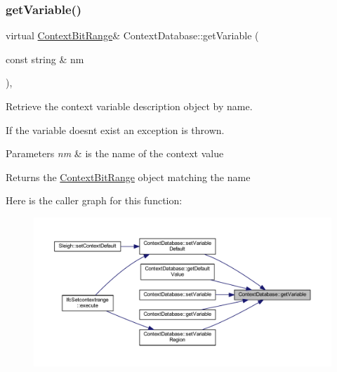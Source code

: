 \subsubsection{\texorpdfstring{getVariable()}{getVariable()}\hspace{0.1cm}{\footnotesize\ttfamily [1/3]}}
{\footnotesize\ttfamily virtual \mbox{\hyperlink{class_context_bit_range}{Context\+Bit\+Range}}\& Context\+Database\+::get\+Variable (\begin{DoxyParamCaption}\item[{const string \&}]{nm }\end{DoxyParamCaption})\hspace{0.3cm}{\ttfamily [protected]}, {}}



Retrieve the context variable description object by name. 

If the variable doesn\textquotesingle{}t exist an exception is thrown. 
\begin{DoxyParams}{Parameters}
{\em nm} & is the name of the context value \\
\hline
\end{DoxyParams}
\begin{DoxyReturn}{Returns}
the \mbox{\hyperlink{class_context_bit_range}{Context\+Bit\+Range}} object matching the name 
\end{DoxyReturn}
Here is the caller graph for this function\+:
\nopagebreak
\begin{figure}[H]
\begin{center}
\leavevmode
\includegraphics[width=350pt]{class_context_database_a1ebd1d177e17c5ea1e877f8b1d8c581d_icgraph}
\end{center}
\end{figure}
\mbox{\label{class_context_database_a91002953f968ee118476983ef49d525b}} 
